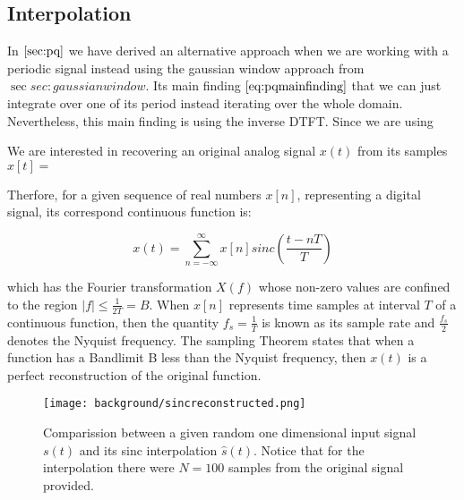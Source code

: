 \subsection{Interpolation}
\label{sec:sincinterpolation}

In $\ref{sec:pq}$ we have derived an alternative approach when we are working with a periodic signal instead using the gaussian window approach from $\sec{sec:gaussianwindow}$. Its main finding $\ref{eq:pqmainfinding}$ that we can just integrate over one of its period instead iterating over the whole domain. Nevertheless, this main finding is using the inverse DTFT. Since we are using 

We are interested in recovering an original analog signal $x(t)$ from its samples $x[t] = $ 

Therfore, for a given sequence of real numbers $x[n]$, representing a digital signal, its correspond continuous function is: 

\begin{equation}
  x(t) = \sum_{n=-\infty}^{\infty} x[n] sinc\left(\frac{t-nT}{T}\right)
\end{equation}

which has the Fourier transformation $X(f)$ whose non-zero values are confined to the region $|f| \leq \frac{1}{2T} = B$.
When $x[n]$ represents time samples at interval $T$ of a continuous function, then the quantity $f_s = \frac{1}{T}$ is known as its sample rate and $\frac{f_s}{2}$ denotes the Nyquist frequency. The sampling Theorem states that when a function has a Bandlimit B less than the Nyquist frequency, then $x(t)$ is a perfect reconstruction of the original function. 

\begin{figure}[ht]
  \centering
  \texttt{[image: background/sincreconstructed.png]}
  \caption{Comparission between a given random one dimensional input signal $s(t)$ and its sinc interpolation $\hat{s}(t)$. Notice that for the interpolation there were $N=100$ samples from the original signal provided.}
  \label{fig:plotsincinterpolation}  
\end{figure}
